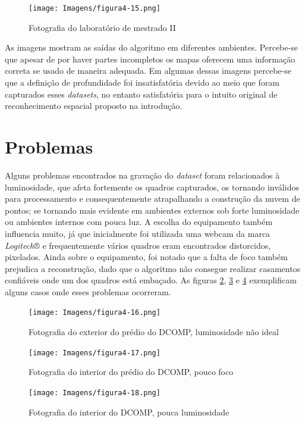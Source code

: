\begin{figure}[!htb]
	\centering
		\texttt{[image: Imagens/figura4-15.png]}
	\caption{Fotografia do laboratório de mestrado II}
	\label{fig4:15}
\end{figure}

As imagens mostram as saídas do algoritmo em diferentes ambientes. Percebe-se que apesar de por haver partes incompletos os mapas oferecem uma informação correta se usado de maneira adequada. Em algumas dessas imagens percebe-se que a definição de profundidade foi insatisfatória devido ao meio que foram capturados esses \textit{datasets}, no entanto satisfatória para o intuito original de reconhecimento espacial proposto na introdução.

\section{Problemas}

Alguns problemas encontrados na gravação do \textit{dataset} foram relacionados à luminosidade, que afeta fortemente os quadros capturados, os tornando inválidos para processamento e consequentemente atrapalhando a construção da nuvem de pontos; se tornando mais evidente em ambientes externos sob forte luminosidade ou ambientes internos com pouca luz. A escolha do equipamento também influencia muito, já que inicialmente foi utilizada uma webcam da marca \textit{Logitech}® e frequentemente vários quadros eram encontrados distorcidos, pixelados. Ainda sobre o equipamento, foi notado que a falta de foco também prejudica a reconstrução, dado que o algoritmo não consegue realizar casamentos confiáveis onde um dos quadros está embaçado. As figuras \ref{fig4:16}, \ref{fig4:17} e \ref{fig4:18}  exemplificam alguns casos onde esses problemas ocorreram.

\begin{figure}[!htb]
	\centering
		\texttt{[image: Imagens/figura4-16.png]}
	\caption{Fotografia do exterior do prédio do DCOMP, luminosidade não ideal}
	\label{fig4:16}
\end{figure}

\begin{figure}[!htb]
	\centering
		\texttt{[image: Imagens/figura4-17.png]}
	\caption{Fotografia do interior do prédio do DCOMP, pouco foco}
	\label{fig4:17}
\end{figure}

\begin{figure}[!htb]
	\centering
		\texttt{[image: Imagens/figura4-18.png]}
	\caption{Fotografia do interior do DCOMP, pouca luminosidade}
	\label{fig4:18}
\end{figure}